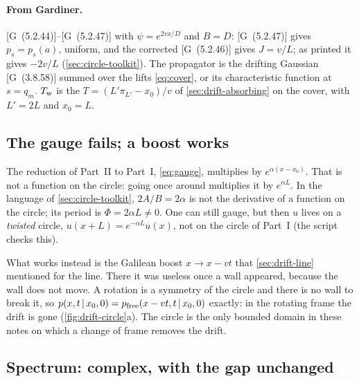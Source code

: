 \documentclass[11pt]{article}
\numberwithin{equation}{section}
\newcommand{\given}{\,|\,}
\newcommand{\G}[1]{[G~(#1)]}
\begin{document}
\paragraph{From Gardiner.} \G{5.2.44}--\G{5.2.47} with $\psi=e^{2vx/D}$ and $B=D$: \G{5.2.47} gives
$p_s=p_s(a)$, uniform, and the corrected \G{5.2.46} gives $J=v/L$; as printed it gives $-2v/L$
(\cref{sec:circle-toolkit}). The propagator is the drifting Gaussian \G{3.8.58} summed over the lifts
\cref{eq:cover}, or its characteristic function at $s=q_m$. $T_{\rm w}$ is the $T=(L'\pi_{L'}-x_0)/v$ of
\cref{sec:drift-absorbing} on the cover, with $L'=2L$ and $x_0=L$.

\subsection{The gauge fails; a boost works}

The reduction of Part~II to Part~I, \cref{eq:gauge}, multiplies by $e^{\alpha(x-x_0)}$. That is not a function
on the circle: going once around multiplies it by $e^{\alpha L}$. In the language of
\cref{sec:circle-toolkit}, $2A/B=2\alpha$ is not the derivative of a function on the circle; its period is
$\Phi=2\alpha L\neq0$. One can still gauge, but then $u$ lives on a \emph{twisted} circle,
$u(x+L)=e^{-\alpha L}u(x)$, not on the circle of Part~I (the script checks this).

What works instead is the Galilean boost $x\to x-vt$ that \cref{sec:drift-line} mentioned for the line. There it
was useless once a wall appeared, because the wall does not move. A rotation is a symmetry of the circle and
there is no wall to break it, so $p(x,t\given x_0,0)=p_{\rm free}(x-vt,t\given x_0,0)$ exactly: in the rotating
frame the drift is gone (\cref{fig:drift-circle}a). The circle is the only bounded domain in these notes on which
a change of frame removes the drift.

\subsection{Spectrum: complex, with the gap unchanged}
\end{document}
